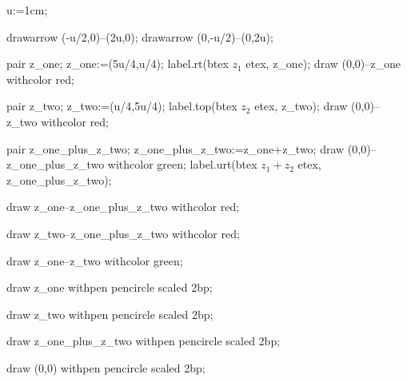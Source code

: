 u:=1cm;

drawarrow (-u/2,0)--(2u,0);
drawarrow (0,-u/2)--(0,2u);

pair z_one;
z_one:=(5u/4,u/4);
label.rt(btex $z_1$ etex, z_one);
draw (0,0)--z_one withcolor red;

pair z_two;
z_two:=(u/4,5u/4);
label.top(btex $z_2$ etex, z_two);
draw (0,0)--z_two withcolor red;

pair z_one_plus_z_two;
z_one_plus_z_two:=z_one+z_two;
draw (0,0)--z_one_plus_z_two withcolor green;
label.urt(btex $z_1+z_2$ etex, z_one_plus_z_two);

draw z_one--z_one_plus_z_two withcolor red;

draw z_two--z_one_plus_z_two withcolor red;

draw z_one--z_two withcolor green;

draw z_one withpen pencircle scaled 2bp;

draw z_two withpen pencircle scaled 2bp;

draw z_one_plus_z_two withpen pencircle scaled 2bp;

draw (0,0) withpen pencircle scaled 2bp;